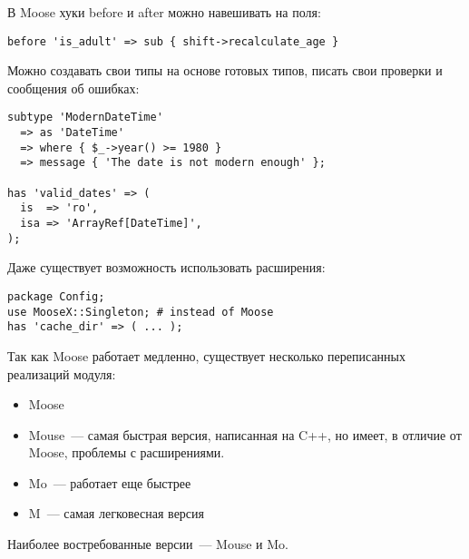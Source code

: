 В Moose хуки before и after можно навешивать на поля:
\begin{verbatim}
before 'is_adult' => sub { shift->recalculate_age }
\end{verbatim}
Можно создавать свои типы на основе готовых типов, писать свои проверки и сообщения об ошибках:
\begin{verbatim}
subtype 'ModernDateTime'
  => as 'DateTime'
  => where { $_->year() >= 1980 }
  => message { 'The date is not modern enough' };

has 'valid_dates' => (
  is  => 'ro',
  isa => 'ArrayRef[DateTime]',
);
\end{verbatim}
Даже существует возможность использовать расширения:
\begin{verbatim}
package Config;
use MooseX::Singleton; # instead of Moose
has 'cache_dir' => ( ... );
\end{verbatim}

Так как Moose работает медленно, существует несколько переписанных реализаций модуля:
\begin{itemize}
	\item Moose
    \item Mouse~--- самая быстрая версия, написанная на C++, но имеет, в отличие от Moose, проблемы с расширениями.
    \item Mo~--- работает еще быстрее
    \item M~--- самая легковесная версия
\end{itemize}
Наиболее востребованные версии~--- Mouse и Mo.
